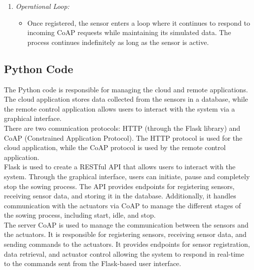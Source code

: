 \begin{enumerate}
    \item \textit{Operational Loop:}
    \begin{itemize}
        \item Once registered, the sensor enters a loop where it continues to respond to incoming CoAP requests while maintaining its simulated data. The process continues indefinitely as long as the sensor is active.
    \end{itemize}
    
\end{enumerate}


\newpage

\subsection{Python Code}


The Python code is responsible for managing the cloud and remote applications. The cloud application stores data collected from the sensors in a database, while the remote control application allows users to interact with the system via a graphical interface.\\

There are two comunication protocols: HTTP (through the Flask library) and CoAP (Constrained Application Protocol). The HTTP protocol is used for the cloud application, while the CoAP protocol is used by the remote control application.\\
Flask is used to create a RESTful API that allows users to interact with the system. Through the graphical interface, users can initiate, pause and completely stop the sowing process. The API provides endpoints for registering sensors, receiving sensor data, and storing it in the database. Additionally, it handles communication with the actuators via CoAP to manage the different stages of the sowing process, including start, idle, and stop.\\

The server CoAP is used to manage the communication between the sensors and the actuators. It is responsible for registering sensors, receiving sensor data, and sending commands to the actuators. It provides endpoints for sensor registration, data retrieval, and actuator control allowing the system to respond in real-time to the commands sent from the Flask-based user interface.



